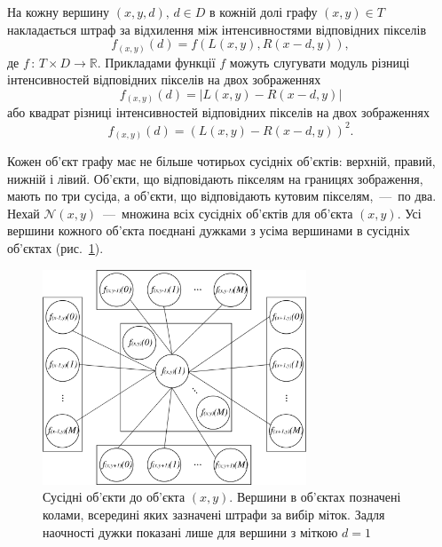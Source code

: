 На кожну вершину $\left(x, y, d \right), \, d \in D$ в кожній долі графу
$\left(x, y \right) \in T$
накладається штраф за відхилення між інтенсивностями відповідних пікселів
\begin{equation} \label{eq:penalty:vertex}
    f_{\left(x, y \right)} \left(d \right) =
    f \left(
        L \left(x, y \right),
        R \left(x - d, y \right)
    \right),
\end{equation}
де $f \, : \, T \times D \to \mathbb{R}$.
Прикладами функції $f$ можуть слугувати модуль
різниці інтенсивностей відповідних пікселів на двох зображеннях
\begin{equation*}
    f_{\left(x, y \right)} \left(d \right) =
    \left| L \left(x, y \right) - R \left(x - d, y \right) \right|
\end{equation*}
або квадрат різниці інтенсивностей відповідних пікселів на двох зображеннях
\begin{equation*}
    f_{\left(x, y \right)} \left(d \right) =
    \left( L \left(x, y \right) - R \left(x - d, y \right) \right)^2.
\end{equation*}

Кожен об'єкт графу має не більше чотирьох сусідніх об'єктів: верхній, правий,
нижній і лівий.
Об'єкти, що відповідають пікселям на границях зображення, мають по три сусіда,
а об'єкти, що відповідають кутовим пікселям,~---~по два.
Нехай $\mathcal{N} \left( x, y \right) $~---~множина всіх
сусідніх об'єктів для об'єкта $\left( x, y \right)$.
Усі вершини кожного об'єкта поєднані дужками з усіма
вершинами в сусідніх об'єктах (рис.~\ref{fig:neighbors}).

\begin{figure}[h]
  \centering
  \includegraphics[width=0.7\textwidth]{images/neighbors}
  \caption{Сусідні об'єкти до об'єкта $\left(x, y \right)$.
           Вершини в об'єктах позначені колами,
           всередині яких зазначені штрафи за вибір міток.
           Задля наочності дужки показані лише для вершини з міткою $d = 1$}
  \label{fig:neighbors}
\end{figure}

